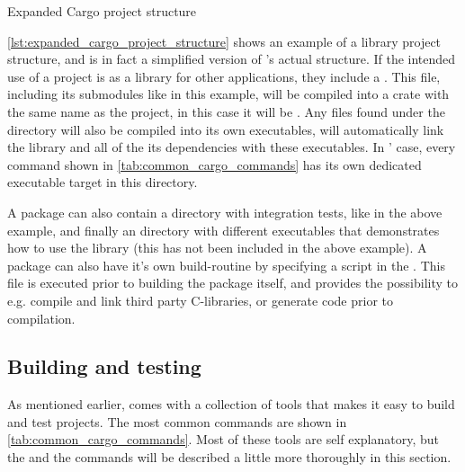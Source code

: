 \begin{listing}
\caption{Expanded Cargo project structure}
\label{lst:expanded_cargo_project_structure}
\end{listing}

\autoref{lst:expanded_cargo_project_structure} shows an example of a library project structure, and is in fact a simplified version of {\cargo}'s actual structure.
If the intended use of a project is as a library for other applications, they include a .
This file, including its submodules like  in this example, will be compiled into a {\rust} crate with the same name as the project, in this case it will be .
Any files found under the  directory will also be compiled into its own executables, {\cargo} will automatically link the library and all of the its dependencies with these executables.
In {\cargo}' case, every command shown in \autoref{tab:common_cargo_commands} has its own dedicated executable target in this directory.

A package can also contain a  directory with integration tests, like in the above example, and finally an  directory with different executables that demonstrates how to use the library (this has not been included in the above example).
A package can also have it's own build-routine by specifying a  script in the .
This file is executed prior to building the package itself, and provides the possibility to e.g. compile and link third party C-libraries, or generate code prior to compilation.

\subsection{Building and testing}

As mentioned earlier, {\cargo} comes with a collection of tools that makes it easy to build and test {\rust} projects.
The most common commands are shown in \autoref{tab:common_cargo_commands}.
Most of these tools are self explanatory, but the  and the  commands will be described a little more thoroughly in this section.

